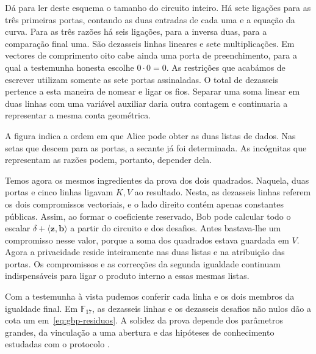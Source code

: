 Dá para ler deste esquema o tamanho do circuito inteiro. Há sete
ligações para as três primeiras portas, contando as duas entradas
de cada uma e a equação da curva. Para as três razões há seis
ligações, para a inversa duas, para a comparação final uma.
São dezasseis linhas lineares e sete multiplicações. Em vectores
de comprimento oito cabe ainda uma porta de preenchimento, para a
qual a testemunha honesta escolhe \(0\cdot0=0\). As restrições que
acabámos de escrever utilizam somente as sete portas assinaladas.
O total de dezasseis pertence a esta maneira de nomear e ligar
os fios. Separar uma soma linear em duas linhas com uma variável
auxiliar daria outra contagem e continuaria a representar a
mesma conta geométrica.

A figura indica a ordem em que Alice pode obter as duas listas de
dados. Nas setas que descem para as portas, a secante já foi
determinada. As incógnitas que representam as razões podem,
portanto, depender dela.
\begin{center}
\end{center}

Temos agora os mesmos ingredientes da prova dos dois quadrados.
Naquela, duas portas e cinco linhas ligavam \(K,V\) ao resultado.
Nesta, as dezasseis linhas referem os dois compromissos vectoriais,
e o lado direito contém apenas constantes públicas. Assim, ao
formar o coeficiente reservado, Bob pode calcular todo o escalar
\(\delta+\langle\boldsymbol z,\boldsymbol b\rangle\) a partir
do circuito e dos desafios. Antes bastava-lhe um compromisso nesse
valor, porque a soma dos quadrados estava guardada em \(V\).
Agora a privacidade reside inteiramente nas duas listas e na
atribuição das portas. Os compromissos e as correcções da segunda
igualdade continuam indispensáveis para ligar o produto interno a
essas mesmas listas.

Com a testemunha à vista pudemos conferir cada linha e os dois
membros da igualdade final. Em \(\mathbb F_{17}\), as dezasseis
linhas e os dezasseis desafios não nulos dão a cota um
em~\eqref{eq:gbp-residuos}. A solidez da prova depende dos parâmetros
grandes, da vinculação a uma abertura e das hipóteses de conhecimento
estudadas com o protocolo
\cite{eagen-divisors,generalized-bulletproofs-fixed,monero-oxide-fcmp-source}.
